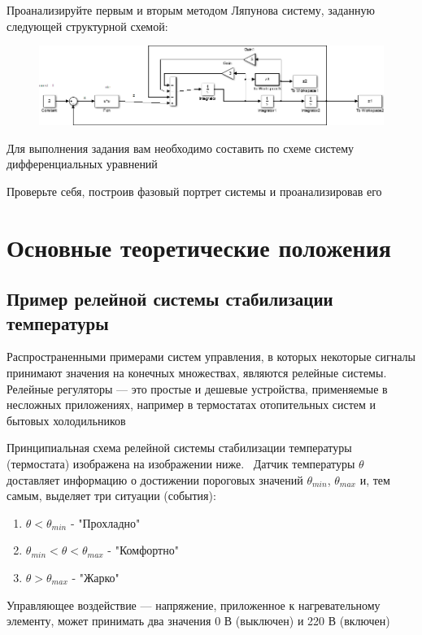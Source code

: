 Проанализируйте первым и вторым методом Ляпунова систему, заданную следующей структурной схемой:

\begin{figure}[H]
	\centering
	\includegraphics[width=0.9\linewidth]{body/images/non-linear-system.png}
\end{figure}

Для выполнения задания вам необходимо составить по схеме систему дифференциальных уравнений

Проверьте себя, построив фазовый портрет системы и проанализировав его

\section{Основные теоретические положения}

\subsection{Пример релейной системы стабилизации температуры}

Распространенными примерами систем управления, в которых некоторые сигналы принимают значения на конечных множествах, являются релейные системы. Релейные регуляторы — это простые и дешевые устройства, применяемые в несложных приложениях, например в термостатах отопительных систем и бытовых холодильников

Принципиальная схема релейной системы стабилизации температуры (термостата) изображена на изображении ниже.  Датчик температуры $\theta$ доставляет информацию о достижении пороговых значений $\theta_{min}$, $\theta_{max}$ и, тем самым, выделяет три ситуации (события):

\begin{enumerate}
	\item $\theta <\theta_{min}$ -  "Прохладно"
	\item $\theta_{min} < \theta <\theta_{max}$ - "Комфортно"
	\item $\theta >\theta_{max}$ - "Жарко"
\end{enumerate}

Управляющее воздействие  — напряжение, приложенное к нагревательному элементу, может принимать два значения 0 В (выключен) и 220 В (включен)

